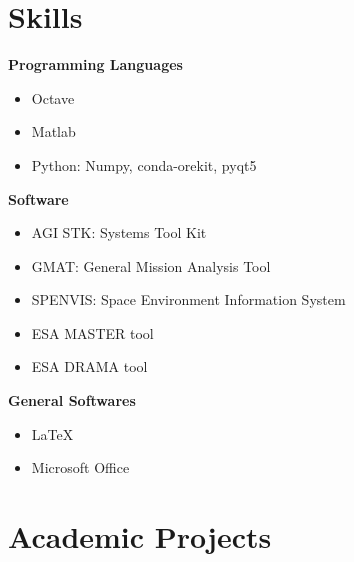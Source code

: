 \documentclass[10pt,a4paper,times]{moderncv}
\begin{document}
\section{Skills}
\textbf{Programming Languages}
\begin{itemize}
\item {Octave}
\item {Matlab}
\item{Python: Numpy, conda-orekit, pyqt5}
\end{itemize}
\textbf{Software}
\begin{itemize}
\item{AGI STK: Systems Tool Kit}
\item{GMAT: General Mission Analysis Tool}
\item{SPENVIS: Space Environment Information System}
\item{ESA MASTER tool}
\item{ESA DRAMA tool}
\end{itemize}
\textbf{General Softwares}
\begin{itemize}
\item {LaTeX}
\item {Microsoft Office}
\end{itemize}

\section{Academic Projects}
\end{document}
